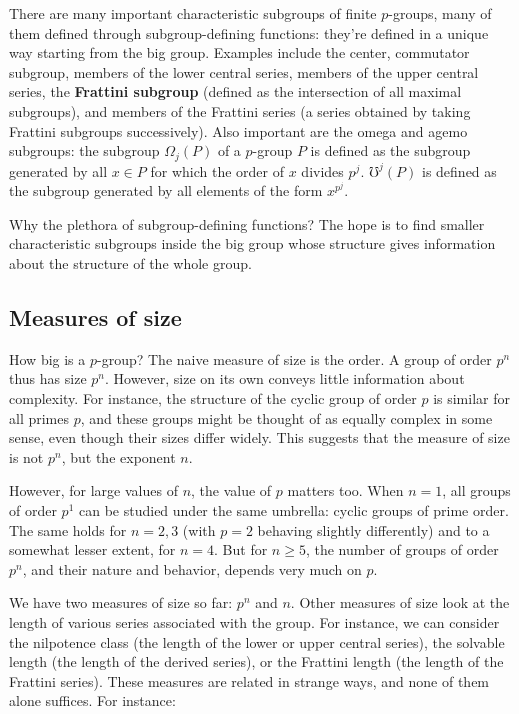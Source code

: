 \documentclass{amsart}
\renewcommand{\definedind}[1]{{\bf #1}}
\begin{document}
There are many important characteristic subgroups of finite
$p$-groups, many of them defined through subgroup-defining functions:
they're defined in a unique way starting from the big group. Examples
include the center, commutator subgroup, members of the lower central
series, members of the upper central series, the \definedind{Frattini
  subgroup} (defined as the intersection of all maximal subgroups),
and members of the Frattini series (a series obtained by taking
Frattini subgroups successively). Also important are the omega and
agemo subgroups: the subgroup $\Omega_j(P)$ of a $p$-group $P$ is
defined as the subgroup generated by all $x \in P$ for which the order
of $x$ divides $p^j$. $\mho^j(P)$ is defined as the subgroup generated
by all elements of the form $x^{p^j}$.

Why the plethora of subgroup-defining functions? The hope is to find
smaller characteristic subgroups inside the big group whose structure
gives information about the structure of the whole group.

\subsection{Measures of size}

How big is a $p$-group? The naive measure of size is the order. A
group of order $p^n$ thus has size $p^n$. However, size on its own
conveys little information about complexity. For instance, the
structure of the cyclic group of order $p$ is similar for all primes
$p$, and these groups might be thought of as equally complex in some
sense, even though their sizes differ widely. This suggests that
the measure of size is not $p^n$, but the exponent $n$.

However, for large values of $n$, the value of $p$ matters too. When
$n = 1$, all groups of order $p^1$ can be studied under the same
umbrella: cyclic groups of prime order. The same holds for $n = 2,3$
(with $p=2$ behaving slightly differently) and to a somewhat lesser
extent, for $n= 4$. But for $n \ge 5$, the number of groups of order
$p^n$, and their nature and behavior, depends very much on $p$.

We have two measures of size so far: $p^n$ and $n$. Other measures of
size look at the length of various series associated with the
group. For instance, we can consider the nilpotence class (the length
of the lower or upper central series), the solvable length (the length
of the derived series), or the Frattini length (the length of the
Frattini series). These measures are related in strange ways, and none
of them alone suffices. For instance:
\end{document}

